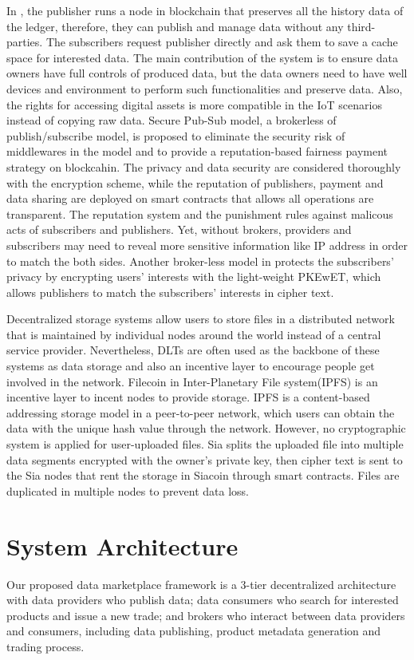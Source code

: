 \documentclass[conference]{IEEEtran}
\begin{document}
In \cite{userCentricData}, the publisher runs a node in blockchain that preserves all the history data of the ledger, therefore, they can publish and manage data without any third-parties. The subscribers request publisher directly and ask them to save a cache space for interested data. The main contribution of the system is to ensure data owners have full controls of produced data, but the data owners need to have well devices and environment to perform such functionalities and preserve data. Also, the rights for accessing digital assets is more compatible in the IoT scenarios instead of copying raw data. Secure Pub-Sub model\cite{SPS}, a brokerless of publish/subscribe model, is proposed to eliminate the security risk of middlewares in the model and to provide a reputation-based fairness payment strategy on blockcahin. The privacy and data security are considered thoroughly with the encryption scheme, while the reputation of publishers, payment and data sharing are deployed on smart contracts that allows all operations are transparent. The reputation system and the punishment rules against malicous acts of subscribers and publishers. Yet, without brokers, providers and subscribers may need to reveal more sensitive information like IP address in order to match the both sides. Another broker-less model in \cite{PrivacyPreservPubSub} protects the subscribers' privacy by encrypting users' interests with the light-weight PKEwET\cite{PKEwET}, which allows publishers to match the subscribers' interests in cipher text. 

Decentralized storage systems allow users to store files in a distributed network that is maintained by individual nodes around the world instead of a central service provider. Nevertheless, DLTs are often used as the backbone of these systems as data storage and also an incentive layer to encourage people get involved in the network. Filecoin \cite{FileCoin} in Inter-Planetary File system(IPFS)\cite{IPFS} is an incentive layer to incent nodes to provide storage. IPFS is a content-based addressing storage model in a peer-to-peer network, which users can obtain the data with the unique hash value through the network. However, no cryptographic system is applied for user-uploaded files. Sia\cite{Sia} splits the uploaded file into multiple data segments encrypted with the owner's private key, then cipher text is sent to the Sia nodes that rent the storage in Siacoin through smart contracts. Files are duplicated in multiple nodes to prevent data loss.
 
\section{System Architecture}
Our proposed data marketplace framework is a 3-tier decentralized architecture with data providers who publish data; data consumers who search for interested products and issue a new trade; and brokers who interact between data providers and consumers, including data publishing, product metadata generation and trading process.
\end{document}
